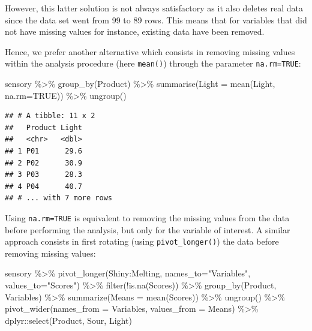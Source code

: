 \documentclass[
]{krantz}
\makeatletter
\newenvironment{Shaded}{\begin{snugshade}}{\end{snugshade}}
\newcommand{\AttributeTok}[1]{\textcolor[rgb]{0.61,0.61,0.61}{#1}}
\newcommand{\ConstantTok}[1]{\textcolor[rgb]{0,0,0}{#1}}
\newcommand{\FunctionTok}[1]{\textcolor[rgb]{0,0,0}{#1}}
\newcommand{\NormalTok}[1]{#1}
\newcommand{\SpecialCharTok}[1]{\textcolor[rgb]{0,0,0}{#1}}
\newcommand{\StringTok}[1]{\textcolor[rgb]{0.5,0.5,0.5}{#1}}
\newenvironment{kframe}{%
\medskip{}
\setlength{\fboxsep}{.8em}
 \def\at@end@of@kframe{}%
 \ifinner\ifhmode%
  \def\at@end@of@kframe{\end{minipage}}%
  \begin{minipage}{\columnwidth}%
 \fi\fi%
 \def\FrameCommand##1{\hskip\@totalleftmargin \hskip-\fboxsep
 \colorbox{shadecolor}{##1}\hskip-\fboxsep
     \hskip-\linewidth \hskip-\@totalleftmargin \hskip\columnwidth}%
 \MakeFramed {\advance\hsize-\width
   \@totalleftmargin\z@ \linewidth\hsize
   \@setminipage}}%
 {\par\unskip\endMakeFramed%
 \at@end@of@kframe}
\renewenvironment{Shaded}{\begin{kframe}}{\end{kframe}}
\makeatother
\begin{document}
However, this latter solution is not always satisfactory as it also deletes real data since the data set went from 99 to 89 rows. This means that for variables that did not have missing values for instance, existing data have been removed.

Hence, we prefer another alternative which consists in removing missing values within the analysis procedure (here \texttt{mean()}) through the parameter \texttt{na.rm=TRUE}:

\begin{Shaded}
\begin{Highlighting}[]
\NormalTok{sensory }\SpecialCharTok{\%\textgreater{}\%} 
  \FunctionTok{group\_by}\NormalTok{(Product) }\SpecialCharTok{\%\textgreater{}\%} 
  \FunctionTok{summarise}\NormalTok{(}\AttributeTok{Light =} \FunctionTok{mean}\NormalTok{(Light, }\AttributeTok{na.rm=}\ConstantTok{TRUE}\NormalTok{)) }\SpecialCharTok{\%\textgreater{}\%} 
  \FunctionTok{ungroup}\NormalTok{()}
\end{Highlighting}
\end{Shaded}

\begin{verbatim}
## # A tibble: 11 x 2
##   Product Light
##   <chr>   <dbl>
## 1 P01      29.6
## 2 P02      30.9
## 3 P03      28.3
## 4 P04      40.7
## # ... with 7 more rows
\end{verbatim}

Using \texttt{na.rm=TRUE} is equivalent to removing the missing values from the data before performing the analysis, but only for the variable of interest. A similar approach consists in first rotating (using \texttt{pivot\_longer()}) the data before removing missing values:

\begin{Shaded}
\begin{Highlighting}[]
\NormalTok{sensory }\SpecialCharTok{\%\textgreater{}\%} 
  \FunctionTok{pivot\_longer}\NormalTok{(Shiny}\SpecialCharTok{:}\NormalTok{Melting, }
               \AttributeTok{names\_to=}\StringTok{"Variables"}\NormalTok{, }\AttributeTok{values\_to=}\StringTok{"Scores"}\NormalTok{) }\SpecialCharTok{\%\textgreater{}\%} 
  \FunctionTok{filter}\NormalTok{(}\SpecialCharTok{!}\FunctionTok{is.na}\NormalTok{(Scores)) }\SpecialCharTok{\%\textgreater{}\%} 
  \FunctionTok{group\_by}\NormalTok{(Product, Variables) }\SpecialCharTok{\%\textgreater{}\%} 
  \FunctionTok{summarize}\NormalTok{(}\AttributeTok{Means =} \FunctionTok{mean}\NormalTok{(Scores)) }\SpecialCharTok{\%\textgreater{}\%} 
  \FunctionTok{ungroup}\NormalTok{() }\SpecialCharTok{\%\textgreater{}\%} 
  \FunctionTok{pivot\_wider}\NormalTok{(}\AttributeTok{names\_from =}\NormalTok{ Variables, }\AttributeTok{values\_from =}\NormalTok{ Means) }\SpecialCharTok{\%\textgreater{}\%} 
\NormalTok{  dplyr}\SpecialCharTok{::}\FunctionTok{select}\NormalTok{(Product, Sour, Light)}
\end{Highlighting}
\end{Shaded}
\end{document}
